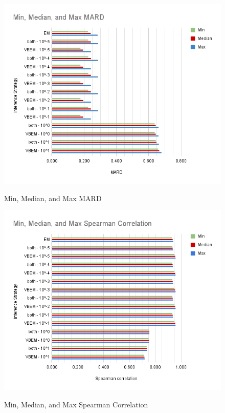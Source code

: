 

% 
% 



\begin{figure}[!t]%
  \centering
  {\includegraphics[width=\textwidth]{Min, Median, and Max MARD.png}}
  \caption{Min, Median, and Max MARD}\label{mardfig}
  \end{figure}

  \begin{figure}[!t]%
    \centering
    {\includegraphics[width=\textwidth]{Min, Median, and Max Spearman Correlation.png}}
    \caption{Min, Median, and Max Spearman Correlation}\label{spearfig}
    \end{figure}
